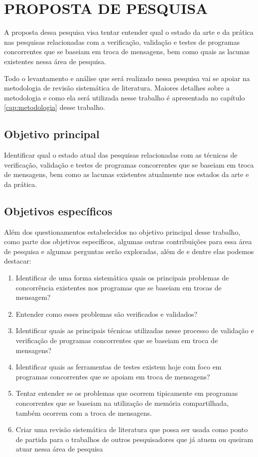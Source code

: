 
\chapter{PROPOSTA DE PESQUISA }
\label{cap:proposta_pesquisa}

A proposta dessa pesquisa visa tentar entender qual o estado da arte e da prática nas pesquisas relacionadas com a verificação, validação e testes de programas concorrentes que se baseiam em troca de mensagens, bem como quais as lacunas existentes nessa área de pesquisa.

Todo o levantamento e análise que será realizado nessa pesquisa vai se apoiar na metodologia de revisão sistemática de literatura. Maiores detalhes sobre a metodologia e como ela será utilizada nesse trabalho é apresentada no capítulo \ref{cap:metodologia} desse trabalho.

 
\section{Objetivo principal} \label{sec:objetivos}
Identificar qual o estado atual das pesquisas relacionadas com as técnicas de verificação, validação e testes de programas concorrentes que se baseiam em troca de mensagens, bem como as lacunas existentes atualmente nos estados da arte e da prática.
	
\section{Objetivos específicos} 

Além dos questionamentos estabelecidos no objetivo principal desse trabalho, como parte dos objetivos específicos, algumas outras contribuições para essa área de pesquisa e algumas perguntas serão exploradas, além de e dentre elas podemos destacar: 

\begin{enumerate}
    \item Identificar de uma forma sistemática quais os principais problemas de concorrência existentes nos programas que se baseiam em trocas de mensagem?
    \item Entender como esses problemas são verificados e validados?
    \item Identificar quais as principais técnicas utilizadas nesse processo de validação e verificação de programas concorrentes que se baseiam em troca de mensagens?
    \item Identificar quais as ferramentas de testes existem hoje com foco em programas concorrentes que se apoiam em troca de mensagens?
    \item Tentar entender se os problemas que ocorrem tipicamente em programas concorrentes que se baseiam na utilização de memória compartilhada, também ocorrem com a troca de mensagens.
    \item Criar uma revisão sistemática de literatura que possa ser usada como ponto de partida para o trabalhos de outros pesquisadores que já atuem ou queiram atuar nessa área de pesquisa
\end{enumerate}

